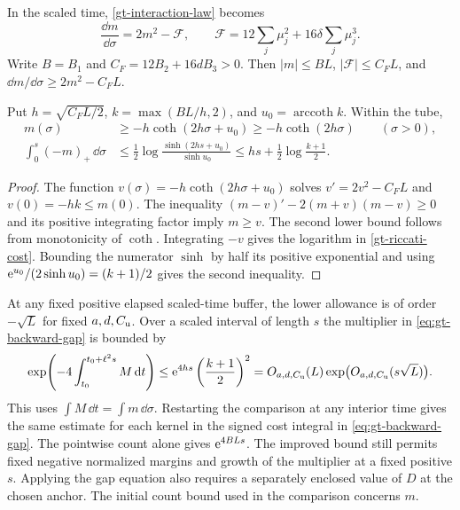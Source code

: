 In the scaled time, \eqref{gt-interaction-law} becomes
\begin{equation}
 \frac{\dd m}{\dd\sigma}=2m^2-\mathcal F,\qquad
 \mathcal F=12\sum_j\mu_j^2+16\delta\sum_j\mu_j^3 .
 \label{gt-interaction-scaled}
\end{equation}
Write \(B=B_1\) and \(C_F=12B_2+16dB_3>0\).
Then \(|m|\le BL\), \(|\mathcal F|\le C_FL\), and
\(\dd m/\dd\sigma\ge 2m^2-C_FL\).

\begin{corollary}
\label{gt-riccati-barrier}
Put \(h=\sqrt{C_FL/2}\), \(k=\max(BL/h,2)\), and
\(u_0=\operatorname{arccoth}k\). Within the tube,
\begin{align}
 m(\sigma)&\ge-h\coth(2h\sigma+u_0)
              \ge-h\coth(2h\sigma)\qquad(\sigma>0),
 \label{gt-riccati-lower}\\
 \int_0^s(-m)_+\,\dd\sigma
    &\le \frac12\log\frac{\sinh(2hs+u_0)}{\sinh u_0}
       \le hs+\frac12\log\frac{k+1}{2}.
 \label{gt-riccati-cost}
\end{align}
\end{corollary}
\begin{proof}
The function \(v(\sigma)=-h\coth(2h\sigma+u_0)\) solves
\(v'=2v^2-C_FL\) and \(v(0)=-hk\le m(0)\). The inequality
\((m-v)'-2(m+v)(m-v)\ge0\) and its positive integrating factor
imply \(m\ge v\). The second lower bound follows from monotonicity
of \(\coth\). Integrating \(-v\) gives the logarithm in
\eqref{gt-riccati-cost}. Bounding the numerator \(\sinh\) by half
its positive exponential and using
\(\mathrm e^{u_0}/(2\sinh u_0)=(k+1)/2\) gives the second inequality.
\end{proof}

At any fixed positive elapsed scaled-time buffer, the lower allowance
is of order \(-\sqrt L\) for fixed \(a,d,C_{\rm u}\). Over a
scaled interval of length \(s\) the multiplier in
\eqref{eq:gt-backward-gap} is bounded by
\begin{equation}
 \exp\!\left(-4\int_{t_0}^{t_0+\ell^2s} M\,\mathrm d t\right)
 \le \mathrm e^{4hs}\left(\frac{k+1}{2}\right)^2
 =O_{a,d,C_{\rm u}}(L)\exp\!\big(O_{a,d,C_{\rm u}}(s\sqrt L)\big).
 \label{gt-riccati-multiplier}
\end{equation}
This uses \(\int M\,\dd t=\int m\,\dd\sigma\). Restarting the
comparison at any interior time gives the same estimate for each
kernel in the signed cost integral in \eqref{eq:gt-backward-gap}.
The pointwise count alone gives \(\mathrm e^{4BLs}\). The improved bound
still permits fixed negative normalized margins and growth of the
multiplier at a fixed positive \(s\). Applying the gap equation
also requires a separately enclosed value of \(D\) at the chosen
anchor. The initial count bound used in the comparison concerns \(m\).

